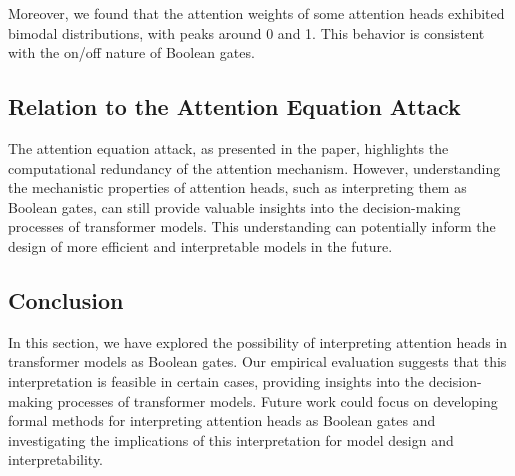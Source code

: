 Moreover, we found that the attention weights of some attention heads exhibited bimodal distributions, with peaks around 0 and 1. This behavior is consistent with the on/off nature of Boolean gates.













\subsection{Relation to the Attention Equation Attack}













The attention equation attack, as presented in the paper, highlights the computational redundancy of the attention mechanism. However, understanding the mechanistic properties of attention heads, such as interpreting them as Boolean gates, can still provide valuable insights into the decision-making processes of transformer models. This understanding can potentially inform the design of more efficient and interpretable models in the future.













\subsection{Conclusion}













In this section, we have explored the possibility of interpreting attention heads in transformer models as Boolean gates. Our empirical evaluation suggests that this interpretation is feasible in certain cases, providing insights into the decision-making processes of transformer models. Future work could focus on developing formal methods for interpreting attention heads as Boolean gates and investigating the implications of this interpretation for model design and interpretability.













